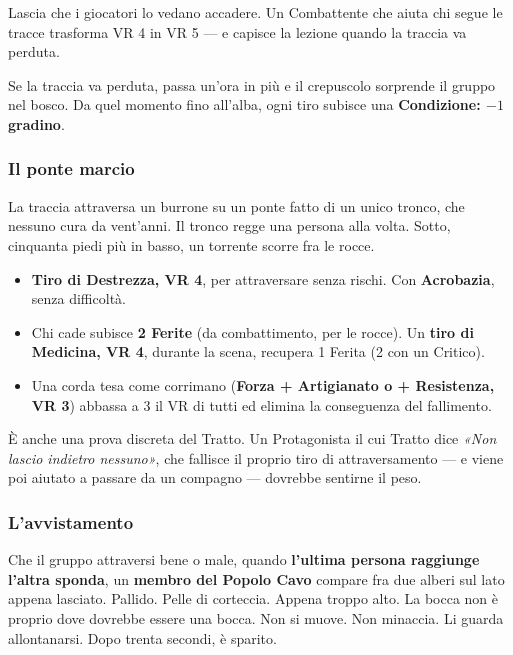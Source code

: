 \documentclass[10pt,a4paper]{article}
\newcommand{\tightlist}{\setlength{\itemsep}{0pt}\setlength{\parskip}{0pt}}
\begin{document}
Lascia che i giocatori lo vedano accadere. Un Combattente che aiuta chi segue le tracce trasforma VR 4 in VR 5 --- e capisce la lezione quando la traccia va perduta.

Se la traccia va perduta, passa un'ora in più e il crepuscolo sorprende il gruppo nel bosco. Da quel momento fino all'alba, ogni tiro subisce una \textbf{Condizione: $-1$ gradino}.

\subsubsection{Il ponte marcio}\label{il-ponte-marcio}

La traccia attraversa un burrone su un ponte fatto di un unico tronco, che nessuno cura da vent'anni. Il tronco regge una persona alla volta. Sotto, cinquanta piedi più in basso, un torrente scorre fra le rocce.

\begin{itemize}
\tightlist
\item
  \textbf{Tiro di Destrezza, VR 4}, per attraversare senza rischi. Con \textbf{Acrobazia}, senza difficoltà.
\item
  Chi cade subisce \textbf{2 Ferite} (da combattimento, per le rocce). Un \textbf{tiro di Medicina, VR 4}, durante la scena, recupera 1 Ferita (2 con un Critico).
\item
  Una corda tesa come corrimano (\textbf{Forza + Artigianato o + Resistenza, VR 3}) abbassa a 3 il VR di tutti ed elimina la conseguenza del fallimento.
\end{itemize}

È anche una prova discreta del Tratto. Un Protagonista il cui Tratto dice \emph{«Non lascio indietro nessuno»}, che fallisce il proprio tiro di attraversamento --- e viene poi aiutato a passare da un compagno --- dovrebbe sentirne il peso.

\subsubsection{L'avvistamento}\label{lavvistamento}

Che il gruppo attraversi bene o male, quando \textbf{l'ultima persona raggiunge l'altra sponda}, un \textbf{membro del Popolo Cavo} compare fra due alberi sul lato appena lasciato. Pallido. Pelle di corteccia. Appena troppo alto. La bocca non è proprio dove dovrebbe essere una bocca. Non si muove. Non minaccia. Li guarda allontanarsi. Dopo trenta secondi, è sparito.
\end{document}
